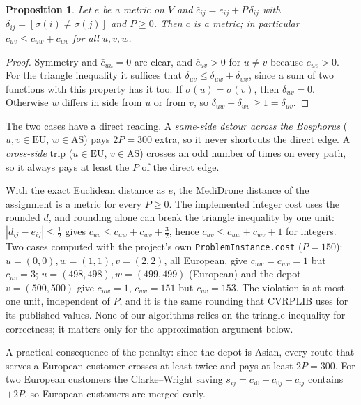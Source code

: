 \documentclass[11pt,a4paper]{article}
\newtheorem{proposition}[theorem]{Proposition}
\theoremstyle{definition}
\theoremstyle{remark}
\newcommand{\code}[1]{\texttt{#1}}
\begin{document}
\begin{proposition}\label{prop:metric}
Let $e$ be a metric on $V$ and $\bar c_{ij} = e_{ij} + P\,\delta_{ij}$ with
$\delta_{ij}=[\sigma(i)\ne\sigma(j)]$ and $P\ge0$. Then $\bar c$ is a metric; in particular
$\bar c_{uv} \le \bar c_{uw} + \bar c_{wv}$ for all $u,v,w$.
\end{proposition}
\begin{proof}
Symmetry and $\bar c_{uu}=0$ are clear, and $\bar c_{uv}>0$ for $u\neq v$ because
$e_{uv}>0$. For the triangle inequality it suffices that
$\delta_{uv}\le\delta_{uw}+\delta_{wv}$, since a sum of two functions with this property
has it too. If $\sigma(u)=\sigma(v)$, then $\delta_{uv}=0$. Otherwise $w$ differs in side
from $u$ or from $v$, so $\delta_{uw}+\delta_{wv}\ge 1=\delta_{uv}$.
\end{proof}
The two cases have a direct reading. A \emph{same-side detour across the Bosphorus}
($u,v\in\mathrm{EU}$, $w\in\mathrm{AS}$) pays $2P=300$ extra, so it never shortcuts the
direct edge. A \emph{cross-side} trip ($u\in\mathrm{EU}$, $v\in\mathrm{AS}$) crosses an odd
number of times on every path, so it always pays at least the $P$ of the direct edge.

With the exact Euclidean distance as $e$, the MediDrone distance of the assignment is a
metric for every $P\ge 0$. The implemented integer cost uses the rounded $d$, and rounding
alone can break the triangle inequality by one unit: $|d_{ij}-e_{ij}|\le\tfrac12$ gives
$c_{uv}\le c_{uw}+c_{wv}+\tfrac32$, hence $c_{uv}\le c_{uw}+c_{wv}+1$ for integers. Two
cases computed with the project's own \code{ProblemInstance.cost} ($P=150$):
$u=(0,0), w=(1,1), v=(2,2)$, all European, give $c_{uw}=c_{wv}=1$ but $c_{uv}=3$;
$u=(498,498), w=(499,499)$ (European) and the depot $v=(500,500)$ give $c_{uw}=1$,
$c_{wv}=151$ but $c_{uv}=153$. The violation is at most one unit, independent of $P$, and
it is the same rounding that CVRPLIB uses for its published values. None of our algorithms
relies on the triangle inequality for correctness; it matters only for the approximation
argument below.

A practical consequence of the penalty: since the depot is Asian, every route that serves
a European customer crosses at least twice and pays at least $2P=300$. For two European
customers the Clarke--Wright saving $s_{ij}=c_{i0}+c_{0j}-c_{ij}$ contains $+2P$, so
European customers are merged early.
\end{document}
